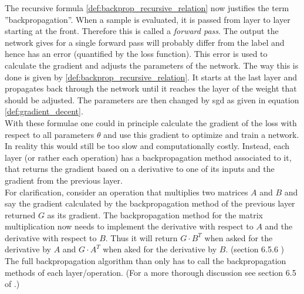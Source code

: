 The recursive formula \eqref{def:backprop_recursive_relation} now justifies the term ''backpropagation''. When a sample is evaluated, it is passed from layer to layer starting at the front. Therefore this is called a \emph{forward pass}. The output the network gives for a single forward pass will probably differ from the label and hence has an error (quantified by the loss function). This error is used to calculate the gradient and adjusts the parameters of the network. The way this is done is given by \eqref{def:backprop_recursive_relation}. It starts at the last layer and propagates back through the network until it reaches the layer of the weight that should be adjusted. The parameters are then changed by \gls{sgd} as given in equation \eqref{def:gradient_decent}.\\
With these formulae one could in principle calculate the gradient of the loss with respect to all parameters $\theta$ and use this gradient to optimize and train a network. In reality this would still be too slow and computationally costly. Instead, each layer (or rather each operation) has a backpropagation method associated to it, that returns the gradient based on a derivative to one of its inputs and the gradient from the previous layer.\\
For clarification, consider an operation that multiplies two matrices $A$ and $B$ and say the gradient calculated by the backpropagation method of the previous layer returned $G$ as its gradient. The backpropagation method for the matrix multiplication now needs to implement the derivative with respect to $A$ and the derivative with respect to $B$. Thus it will return $G\cdot B^T$ when asked for the derivative by $A$ and $G\cdot A^T$ when aked for the derivative by $B$. (section 6.5.6 \cite{deep_learning_book})\\
The full backpropagation algorithm than only has to call the backpropagation methods of each layer/operation. (For a more thorough discussion see section 6.5 of \cite{deep_learning_book}.)

